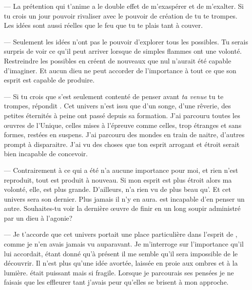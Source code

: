--- La prétention qui t'anime a le double effet de m'exaspérer et de m'exalter. Si tu crois un jour pouvoir rivaliser avec le pouvoir de création de \Mey tu te trompes. Les idées sont aussi réelles que le feu que tu te plais tant à couver.

--- Seulement les idées n'ont pas le pouvoir d'explorer tous les possibles. Tu serais surpris de voir ce qu'il peut arriver lorsque de simples flammes ont une volonté. Restreindre les possibles en créent de nouveaux que nul n'aurait été capable d'imaginer. Et aucun dieu ne peut accorder de l'importance à tout ce que son esprit est capable de produire.

--- Si tu crois que \Mey s'est seulement contenté de penser avant \textit{ta venue} tu te trompes, répondit \Shuru. Cet univers n'est issu que d'un songe, d'une rêverie, des petites éternités à peine ont passé depuis sa formation. J'ai parcouru toutes les œuvres de l'Unique, celles mises à l'épreuve comme celles, trop étranges et sans formes, restées en suspens. J'ai parcouru des mondes en train de naitre, d'autres prompt à disparaitre. J'ai vu des choses que ton esprit arrogant et étroit serait bien incapable de concevoir.

--- Contrairement à \Mey ce qui a été n'a aucune importance pour moi, et rien n'est reproduit, tout est produit à nouveau. Si mon esprit est plus étroit alors ma volonté, elle, est plus grande. D'ailleurs, \Mey n'a rien vu de plus beau qu'\auga. Et cet univers sera son dernier. Plus jamais il n'y en aura. \Cind est incapable d'en penser un autre. Souhaites-tu voir la dernière œuvre de \Mey finir en un long soupir administré par un dieu à l'agonie?

--- Je t'accorde que cet univers portait une place particulière dans l'esprit de \Mey, comme je n'en avais jamais vu auparavant. Je m'interroge sur l'importance qu'il lui accordait, étant donné qu'à présent il me semble qu'il sera impossible de le découvrir. Il n'est plus qu'une idée avortée, laissée en proie aux ombres et à la lumière. \Mey était puissant mais si fragile. Lorsque je parcourais ses pensées je ne faisais que les effleurer tant j'avais peur qu'elles se brisent à mon approche.

  
  
  
  
